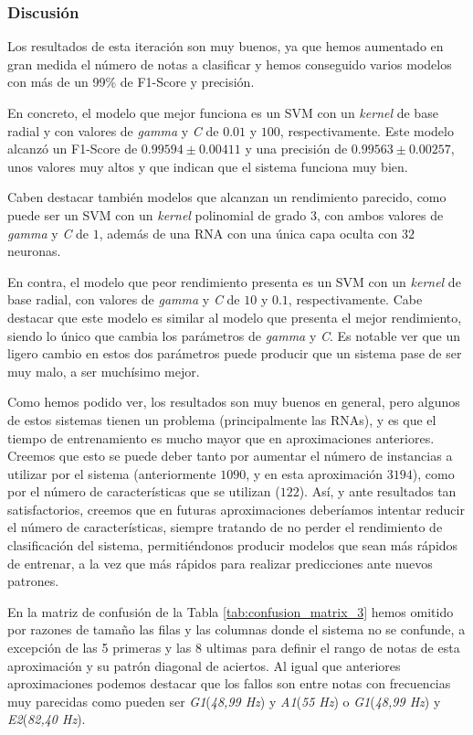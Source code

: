 \documentclass[12pt]{article}
\begin{document}
\newpage
\subsubsection{Discusión}
Los resultados de esta iteración son muy buenos, ya que hemos aumentado en gran medida el número de notas
a clasificar y hemos conseguido varios modelos con más de un 99\% de F1-Score y precisión. 

\bigskip
En concreto, el modelo que mejor funciona es un SVM con un \textit{kernel} de base radial y con valores de \textit{gamma} y
\textit{C} de $0.01$ y $100$, respectivamente. Este modelo alcanzó un F1-Score de 
$0.99594 \pm 0.00411$ y una precisión de $0.99563 \pm 0.00257$, unos valores muy altos y que indican
que el sistema funciona muy bien. 

\bigskip
Caben destacar también modelos que alcanzan un rendimiento parecido,
como puede ser un SVM con un \textit{kernel} polinomial de grado $3$, con ambos valores de \textit{gamma} y \textit{C} de $1$,
además de una RNA con una única capa oculta con $32$ neuronas.

\bigskip
En contra, el modelo que peor rendimiento presenta es un SVM con un \textit{kernel} de base radial,
con valores de \textit{gamma} y \textit{C} de $10$ y $0.1$, respectivamente. Cabe destacar que este modelo
es similar al modelo que presenta el mejor rendimiento, siendo lo único que cambia los parámetros de
\textit{gamma} y \textit{C}. Es notable ver que un ligero cambio en estos dos parámetros puede 
producir que un sistema pase de ser muy malo, a ser muchísimo mejor.

\bigskip
Como hemos podido ver, los resultados son muy buenos en general, pero algunos de estos sistemas tienen un problema (principalmente las RNAs),
y es que el tiempo de entrenamiento es mucho mayor que en aproximaciones anteriores. Creemos que esto se puede deber tanto por
aumentar el número de instancias a utilizar por el sistema (anteriormente $1090$, y en esta aproximación $3194$),
como por el número de características que se utilizan ($122$).
Así, y ante resultados tan satisfactorios, creemos que en futuras aproximaciones deberíamos intentar reducir el número de características, 
siempre tratando de no perder el rendimiento
de clasificación del sistema, permitiéndonos producir modelos que sean más rápidos de entrenar, a la vez que más rápidos
para realizar predicciones ante nuevos patrones.

\bigskip
En la matriz de confusión de la Tabla \ref{tab:confusion_matrix_3} hemos omitido por razones de tamaño las filas y las columnas donde 
el sistema no se confunde, a excepción de las 5 primeras y las 8 ultimas para definir el rango de notas de esta aproximación y su 
patrón diagonal de aciertos. Al igual que anteriores aproximaciones podemos destacar que los fallos son entre notas con frecuencias muy
parecidas como pueden ser \textit{G1}(\textit{48,99 Hz}) y \textit{A1}(\textit{55 Hz}) o \textit{G1}(\textit{48,99 Hz}) y \textit{E2}(\textit{82,40 Hz}).
\end{document}
